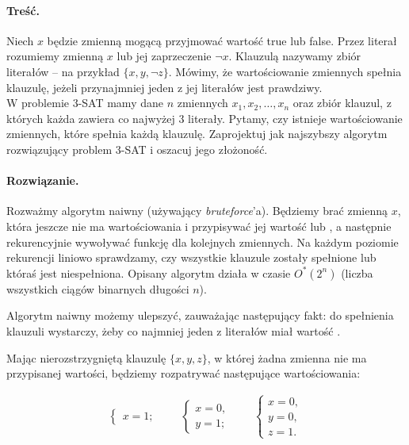 \paragraph{Treść.} Niech $x$ będzie zmienną mogącą przyjmować wartość \textsf{true} lub \textsf{false}. Przez literał rozumiemy zmienną
$x$ lub jej zaprzeczenie $\lnot x$. Klauzulą nazywamy zbiór literałów -- na przykład $\{x, y, \lnot z\}$. Mówimy, że wartościowanie
zmiennych spełnia klauzulę, jeżeli przynajmniej jeden z jej literałów jest prawdziwy.
\\ W problemie 3-SAT mamy dane $n$ zmiennych $x_1, x_2, \ldots, x_n$ oraz zbiór klauzul, z których każda zawiera co najwyżej
3 literały. Pytamy, czy istnieje wartościowanie zmiennych, które spełnia każdą klauzulę.
Zaprojektuj jak najszybszy algorytm rozwiązujący problem 3-SAT i oszacuj jego złożoność.

\paragraph{Rozwiązanie.} Rozważmy algorytm naiwny (używający \textit{bruteforce}'a). Będziemy brać zmienną $x$, która jeszcze nie ma wartościowania i przypisywać jej wartość \true{} lub \false, a następnie rekurencyjnie wywoływać funkcję dla kolejnych zmiennych. Na każdym poziomie rekurencji liniowo sprawdzamy, czy wszystkie klauzule zostały spełnione lub któraś jest niespełniona. Opisany algorytm działa w czasie $O^*(2^n)$ (liczba wszystkich ciągów binarnych długości $n$).


Algorytm naiwny możemy ulepszyć, zauważając następujący fakt: do spełnienia klauzuli wystarczy, żeby co najmniej jeden z literałów miał wartość \true. 

Mając nierozstrzygniętą klauzulę $\{x, y, z\}$, w której żadna zmienna nie ma przypisanej wartości, będziemy rozpatrywać następujące wartościowania:

\begin{align*}
	\begin{cases}
		x = 1;
	\end{cases}
	\qquad
	\begin{cases}
		x = 0, \\
		y = 1;
	\end{cases}
	\qquad
	\begin{cases}
		x = 0, \\
		y = 0,\\
		z = 1.
	\end{cases}
\end{align*}

